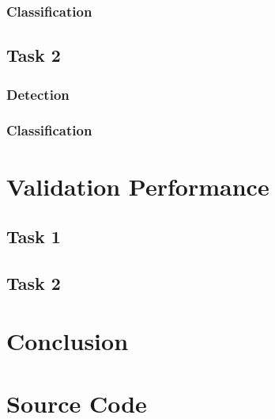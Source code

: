 \documentclass{article}
\begin{document}
\subsubsection*{Classification}

\subsection{Task 2}
\label{sec:implementation-2}

\subsubsection*{Detection}

\subsubsection*{Classification}

\section{Validation Performance}
\label{sec:validation}

\subsection{Task 1}
\label{sec:validation-1}

\subsection{Task 2}
\label{sec:validation-2}

\section{Conclusion}
\label{sec:conclusion}

\clearpage

\appendix

\section{Source Code}
\label{sec:source-code}
\end{document}
